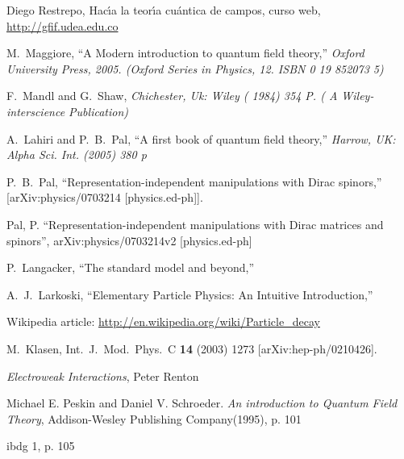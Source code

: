 \begin{thebibliography}{99}
 Diego Restrepo, Hac\'\i a la teor\'\i a cu\'antica de campos, curso web, \url{http://gfif.udea.edu.co}

  M.~Maggiore,
  ``A Modern introduction to quantum field theory,''
{\it  Oxford University Press, 2005. (Oxford Series in Physics, 12. ISBN 0 19 852073 5)}

  F.~Mandl and G.~Shaw,
{\it  Chichester, Uk: Wiley ( 1984) 354 P. ( A Wiley-interscience Publication)}

  A.~Lahiri and P.~B.~Pal,
  ``A first book of quantum field theory,''
  {\it  Harrow, UK: Alpha Sci. Int. (2005) 380 p}


P.~B.~Pal,
``Representation-independent manipulations with Dirac spinors,''
[arXiv:physics/0703214 [physics.ed-ph]].

 Pal, P. ``Representation-independent manipulations with Dirac matrices and spinors'',
	arXiv:physics/0703214v2 [physics.ed-ph]

P.~Langacker,
``The standard model and beyond,''

A.~J.~Larkoski,
``Elementary Particle Physics: An Intuitive Introduction,''

        
 Wikipedia article: \url{http://en.wikipedia.org/wiki/Particle_decay}

  M.~Klasen,
  Int.\ J.\ Mod.\ Phys.\  C {\bf 14} (2003) 1273
  [arXiv:hep-ph/0210426].

 \emph{Electroweak Interactions}, Peter Renton


Michael E. Peskin and Daniel V. Schroeder. \emph{An introduction to
Quantum Field Theory}, Addison-Wesley Publishing Company(1995), p.
101

ibdg 1, p. 105


\end{thebibliography}
